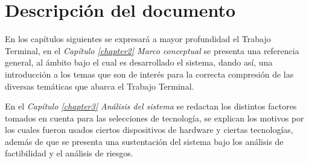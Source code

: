 \section{Descripción del documento}
En los capítulos siguientes se expresará a mayor profundidad el Trabajo Terminal, en el \textit{Capítulo \ref{chapter2} Marco conceptual} se presenta una referencia general, al ámbito bajo el cual es desarrollado el sistema, dando así, una introducción a los temas que son de interés para la correcta compresión de las diversas temáticas que abarca el Trabajo Terminal.

En el \textit{Capítulo \ref{chapter3} Análisis del sistema} se redactan los distintos factores tomados en cuenta para las selecciones de tecnología, se explican los motivos por los cuales fueron usados ciertos dispositivos de hardware y ciertas tecnologías, además de que se presenta una sustentación del sistema bajo los análisis de factibilidad y el análisis de riesgos.


